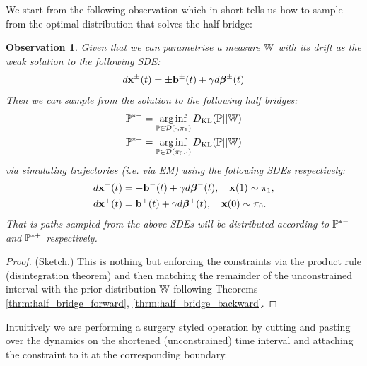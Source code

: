 \documentclass[a4paper,12pt,twoside,openright]{report}
\newtheorem{observation}[theorem]{Observation}
\theoremstyle{definition}
\begin{document}
We start from the following observation which in short tells us how to sample from the optimal distribution that solves the half bridge:
\begin{observation}
Given that we can parametrise a measure $\W$ with its drift as the weak solution to the following SDE:
\begin{align*}
    d\rvx^{\pm}(t) =  \pm \rvb^{\pm}(t) + \gamma d \rvw^{\pm}(t) 
\end{align*}
Then we can sample from the solution to the following half bridges:
\begin{align*}
   \P^{*-} = \arginf_{\P \in \calD(\cdot,\pi_1)}\KL(\P || \W) \\ 
   \P^{*+} = \arginf_{\P \in \calD(\pi_0,\cdot )}\KL(\P || \W)
\end{align*}
via simulating trajectories (i.e. via EM) using the following SDEs respectively:
\begin{align*}
     d\rvx^{-}(t) &=  - \rvb^{-}(t) + \gamma d \rvw^{-}(t) , \quad  \rvx(1) \sim \pi_1, \\
     d\rvx^{+}(t) &=  \rvb^{+}(t) + \gamma d \rvw^{+}(t) , \quad  \rvx(0) \sim \pi_0.
\end{align*}
That is paths sampled from the above SDEs will be distributed according to $\P^{*-}$ and $\P^{*+}$ respectively.
\end{observation}
\begin{proof}(Sketch.) This is nothing but enforcing the constraints via the product rule (disintegration theorem) and then matching the remainder of the unconstrained interval with the prior distribution $\W$ following Theorems \ref{thrm:half_bridge_forward}, \ref{thrm:half_bridge_backward}.
\end{proof}
Intuitively we are performing a surgery styled operation by cutting and pasting over the dynamics on the shortened (unconstrained) time interval and attaching the constraint to it at the corresponding boundary.
\end{document}
